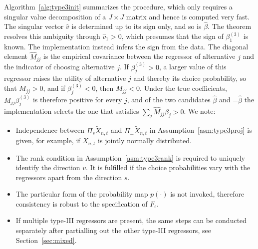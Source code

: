 \documentclass[preprint,12pt,authoryear]{elsarticle}
\begin{document}
Algorithm~\ref{alg:type3init} summarizes the procedure, which only requires a singular value decomposition of a $J \times J$ matrix and hence is computed very fast. The singular vector $\hat v$ is determined up to its sign only, and so is $\hat{\beta}$. The theorem resolves this ambiguity through $\hat v_1 > 0$, which presumes that the sign of $\beta^{(3)}_1$ is known. The implementation instead infers the sign from the data. The diagonal element $\widehat{M}_{jj}$ is the empirical covariance between the regressor of alternative $j$ and the indicator of choosing alternative $j$. If $\beta^{(3)}_j > 0$, a larger value of this regressor raises the utility of alternative $j$ and thereby its choice probability, so that $M_{jj} > 0$, and if $\beta^{(3)}_j < 0$, then $M_{jj} < 0$. Under the true coefficients, $M_{jj} \beta^{(3)}_j$ is therefore positive for every $j$, and of the two candidates $\hat{\beta}$ and $-\hat{\beta}$ the implementation selects the one that satisfies $\sum_j \widehat{M}_{jj} \hat{\beta}_j > 0$. We note:
%
\begin{itemize}
    \item Independence between $\Pi_s \tilde{X}_{n,t}$ and $\Pi_\perp \tilde{X}_{n,t}$
    in Assumption~\ref{asm:type3proj}
    is given, for example, if $X_{n,t}$ is jointly normally distributed.
    \item The rank condition
    in Assumption~\ref{asm:type3rank}
    is required to uniquely identify the direction $v$. It is fulfilled if the choice probabilities vary with the regressors apart from the direction $s$.
    \item The particular form of the probability map $p(\cdot)$ is not invoked, therefore consistency is robust to the specification of $F_\epsilon$.
    \item If multiple type-III regressors are present, the same steps can be conducted separately after partialling out the other type-III regressors, see Section~\ref{sec:mixed}.
\end{itemize}
\end{document}
